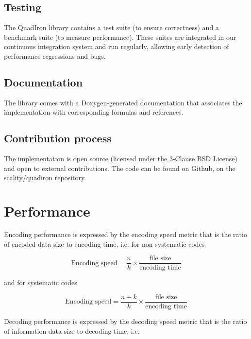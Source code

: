 \documentclass[oneside,9pt]{article}
\begin{document}
\subsection{Testing}

The QuadIron library contains a test suite (to ensure correctness) and a benchmark suite (to measure  performance).
These suites are integrated in our continuous integration system and run regularly, allowing early detection of performance regressions and bugs.

\subsection{Documentation}

The library comes with a Doxygen-generated documentation that associates the implementation with corresponding formulas and references.

\subsection{Contribution process}

The implementation is open source (licensed under the 3-Clause BSD License) and open to external contributions. The code can be found on Github, on the scality/quadiron repository.


\section{Performance}

Encoding performance is expressed by the encoding speed metric that is the ratio of encoded data size to encoding time, i.e. for non-systematic codes

\begin{equation}\label{eq:enc_metric_def}
\text{Encoding speed} =  \frac{ n }{ k } \times  \frac{ \text{file size}  }{ \text{encoding time} }
\end{equation}

and for systematic codes

\begin{equation}\label{eq:enc_metric_def_sys}
\text{Encoding speed} =  \frac{ n - k }{ k } \times  \frac{ \text{file size}  }{ \text{encoding time} }
\end{equation}

Decoding performance is expressed by the decoding speed metric that is the ratio of information data size to decoding time, i.e.
\end{document}
